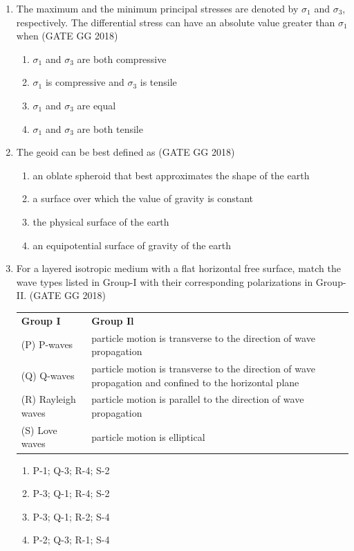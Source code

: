 \documentclass[journal]{IEEEtran}
\begin{document}
\begin{enumerate}[start=1]
\item The maximum and the minimum principal stresses are denoted by $\sigma_1$ and $\sigma_3$, respectively. 
The differential stress can have an absolute value greater than $\sigma_1$ when  
\hfill(GATE GG 2018)
\begin{enumerate}
\item $\sigma_1$ and $\sigma_3$ are both compressive
\item $\sigma_1$ is compressive and $\sigma_3$ is tensile
\item $\sigma_1$ and $\sigma_3$ are equal
\item $\sigma_1$ and $\sigma_3$ are both tensile
\end{enumerate}

\item The geoid can be best defined as  
\hfill(GATE GG 2018)
\begin{enumerate}
\item an oblate spheroid that best approximates the shape of the earth
\item a surface over which the value of gravity is constant
\item the physical surface of the earth
\item an equipotential surface of gravity of the earth
\end{enumerate}

\item For a layered isotropic medium with a flat horizontal free surface, match the wave types listed in Group-I with their corresponding polarizations in Group-II.
\hfill(GATE GG 2018)
\begin{tabular}{ l l }
\textbf{Group I} & \textbf{Group Il}\\
(P) P-waves & particle motion is transverse to the direction of wave propagation\\
(Q) Q-waves & particle motion is transverse to the direction of wave propagation and confined to the horizontal plane\\
(R) Rayleigh waves & particle motion is parallel  to the direction of wave propagation\\
(S) Love waves & particle motion is elliptical
\end{tabular}
\begin{multicols}{2}
\begin{enumerate}
\item P-1; Q-3; R-4; S-2
\item P-3; Q-1; R-4; S-2
\item P-3; Q-1; R-2; S-4
\item P-2; Q-3; R-1; S-4
\end{enumerate}
\end{multicols}


\end{enumerate}
\end{document}
